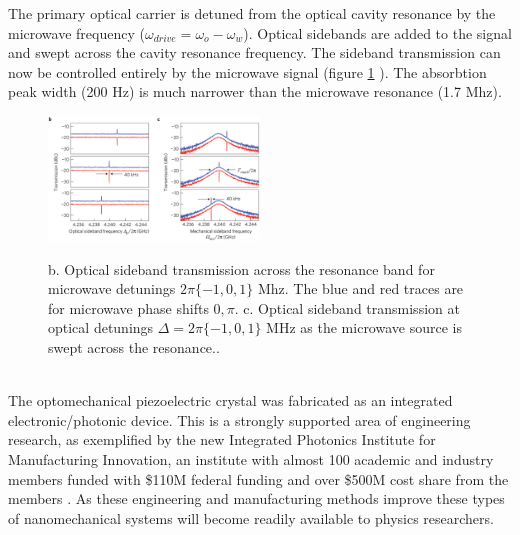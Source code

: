 \documentclass[a4paper,11pt, twocolumn]{article}
\numberwithin{equation}{section}
\begin{document}
The primary optical carrier is detuned from the optical cavity resonance by the microwave frequency ($\omega_{drive}=\omega_{o}-\omega_w$).
Optical sidebands are added to the signal and swept across the cavity resonance frequency. 
The sideband transmission can now be controlled entirely by the microwave signal (figure \ref{fig:transparency} ). 
The absorbtion peak width (200 Hz) is much narrower than the microwave resonance (1.7 Mhz). 
\begin{figure}
 \caption{ b. Optical sideband transmission across the resonance band for microwave detunings $2\pi\{-1,0,1\}$ Mhz. The blue and red traces are for microwave phase shifts $0,\pi$. c. Optical sideband transmission at optical detunings $\Delta=2\pi\{-1,0,1\}$ MHz as the microwave source is swept across the resonance.\cite{nanoCrystal}.}
 \centering
   \includegraphics[width=0.5\textwidth]{figs/opticaltransparency}
 \label{fig:transparency}
\end{figure}
\\
The optomechanical piezoelectric crystal was fabricated as an integrated electronic/photonic device.
This is a strongly supported area of engineering research, as exemplified by the new Integrated Photonics Institute for Manufacturing Innovation, 
an institute with almost 100 academic and industry members funded with \$110M federal funding and over \$500M cost share from the members \cite{ipimi}.
As these engineering and manufacturing methods improve these types of nanomechanical systems will become readily available to physics researchers.
\end{document}
